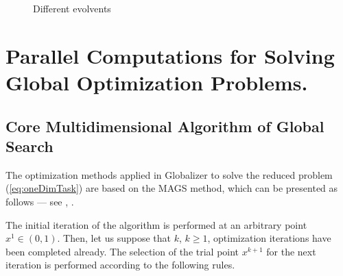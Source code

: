 \documentclass[runningheads]{llncs}
\begin{document}

\begin{figure}[ht]
    \centering
    \caption{Different evolvents}
\end{figure}

\section{Parallel Computations for Solving Global Optimization Problems.}
\subsection{Core Multidimensional Algorithm of Global Search}

The optimization methods applied in Globalizer to solve the reduced problem
(\ref{eq:oneDimTask}) are based on the MAGS method, which can be presented as follows ---
see \cite{strongin1978}, \cite{strSergGO}.
\par
The initial iteration of the algorithm is performed at an arbitrary point \mbox{\(x^1\in(0,1)\)}.
Then, let us suppose that \(k\), \(k\ge 1\), optimization iterations have been completed already.
The selection of the trial point \(x^{k+1}\) for the next iteration is performed according to the
following rules.
\end{document}
